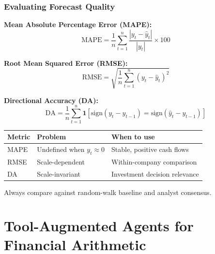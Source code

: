 \documentclass[9pt,t]{beamer}
\begin{document}
\begin{frame}
\frametitle{Evaluating Forecast Quality}

\textbf{Mean Absolute Percentage Error (MAPE):}
\[
  \text{MAPE} = \frac{1}{n}\sum_{t=1}^{n} \frac{|y_t - \hat{y}_t|}{|y_t|} \times 100
\]

\textbf{Root Mean Squared Error (RMSE):}
\[
  \text{RMSE} = \sqrt{\frac{1}{n}\sum_{t=1}^{n}(y_t - \hat{y}_t)^2}
\]

\textbf{Directional Accuracy (DA):}
\[
  \text{DA} = \frac{1}{n}\sum_{t=1}^{n}
  \mathbf{1}\!\left[\mathrm{sign}(y_t - y_{t-1}) = \mathrm{sign}(\hat{y}_t - y_{t-1})\right]
\]

\smallskip
\begin{center}
{\footnotesize
\begin{tabular}{lll}
\toprule
Metric & Problem & When to use \\
\midrule
MAPE & Undefined when $y_t \approx 0$ & Stable, positive cash flows \\
RMSE & Scale-dependent & Within-company comparison \\
DA & Scale-invariant & Investment decision relevance \\
\bottomrule
\end{tabular}}
\end{center}
Always compare against random-walk baseline and analyst consensus.
\end{frame}

\section{Tool-Augmented Agents for Financial Arithmetic}
\end{document}

